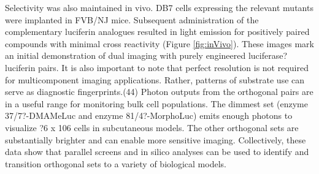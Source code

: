 Selectivity was also maintained in vivo. DB7 cells expressing the relevant mutants were implanted in FVB/NJ mice. Subsequent administration of the complementary luciferin analogues resulted in light emission for positively paired compounds with minimal cross reactivity (Figure \ref{fig:inVivo}). These images mark an initial demonstration of dual imaging with purely engineered luciferase?luciferin pairs. It is also important to note that perfect resolution is not required for multicomponent imaging applications. Rather, patterns of substrate use can serve as diagnostic fingerprints.\cite{Peacor:2017kh}(44) Photon outputs from the orthogonal pairs are in a useful range for monitoring bulk cell populations. The dimmest set (enzyme 37/7?-DMAMeLuc and enzyme 81/4?-MorphoLuc) emits enough photons to visualize ?6 x 106 cells in subcutaneous models. The other orthogonal sets are substantially brighter and can enable more sensitive imaging. Collectively, these data show that parallel screens and in silico analyses can be used to identify and transition orthogonal sets to a variety of biological models.

